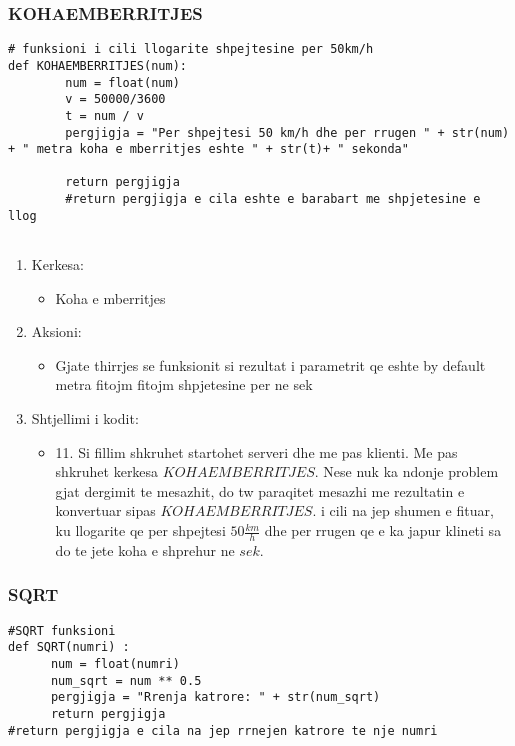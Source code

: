 \documentclass[]{article}
\begin{document}
\subsubsection{KOHAEMBERRITJES}
\begin{lstlisting}
# funksioni i cili llogarite shpejtesine per 50km/h
def KOHAEMBERRITJES(num):
        num = float(num)
        v = 50000/3600
        t = num / v
        pergjigja = "Per shpejtesi 50 km/h dhe per rrugen " + str(num) + " metra koha e mberritjes eshte " + str(t)+ " sekonda"
        
        return pergjigja
        #return pergjigja e cila eshte e barabart me shpjetesine e llog


\end{lstlisting}
\begin{enumerate}
\item Kerkesa:

\begin{itemize}
\item Koha e mberritjes
\end{itemize}
\item Aksioni:

\begin{itemize}
\item Gjate thirrjes  se funksionit si rezultat i parametrit qe eshte by default metra fitojm fitojm shpjetesine per ne sek
\end{itemize}
\item Shtjellimi i kodit:
\begin{itemize}
\item 11.
Si fillim shkruhet startohet serveri dhe me pas klienti. Me pas
shkruhet kerkesa $ KOHAEMBERRITJES$.
Nese nuk ka ndonje problem gjat dergimit te mesazhit, do tw paraqitet mesazhi me rezultatin e konvertuar
sipas $KOHAEMBERRITJES.$ i cili na jep shumen e fituar, ku llogarite qe per shpejtesi $50\frac{km}{h}$ dhe per rrugen qe e ka japur klineti sa do te jete koha e shprehur ne $sek$.
\end{itemize}
\end{enumerate}
\newpage
\subsubsection{SQRT}
\begin{lstlisting}
#SQRT funksioni
def SQRT(numri) :
      num = float(numri)
      num_sqrt = num ** 0.5
      pergjigja = "Rrenja katrore: " + str(num_sqrt) 
      return pergjigja
#return pergjigja e cila na jep rrnejen katrore te nje numri
\end{lstlisting}
\end{document}
